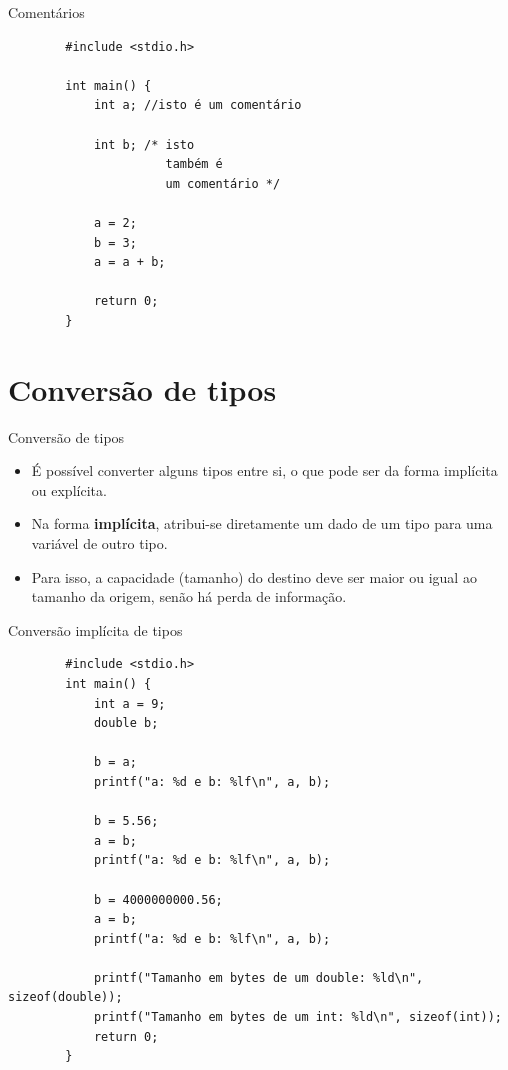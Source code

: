 \documentclass[handout]{beamer}
\begin{document}
\begin{frame}[fragile]{Comentários}
    \begin{verbatim}
        #include <stdio.h>

        int main() {
            int a; //isto é um comentário

            int b; /* isto
                      também é
                      um comentário */

            a = 2;
            b = 3;
            a = a + b;

            return 0;
        }
    \end{verbatim}
\end{frame}

\section{Conversão de tipos}

\begin{frame}[fragile]{Conversão de tipos}
    \begin{itemize}[<+->]
        \item É possível converter alguns tipos entre si, o que pode ser da forma implícita ou explícita.
        \item Na forma \textbf{implícita}, atribui-se diretamente um dado de um tipo para uma variável de outro tipo.
        \item Para isso, a capacidade (tamanho) do destino deve ser maior ou igual ao tamanho da origem, senão há perda de informação.
    \end{itemize}
\end{frame}

\begin{frame}[fragile]{Conversão implícita de tipos}
    \begin{verbatim}
        #include <stdio.h>
        int main() {
            int a = 9;
            double b;

            b = a;
            printf("a: %d e b: %lf\n", a, b);
            
            b = 5.56;
            a = b;
            printf("a: %d e b: %lf\n", a, b);
            
            b = 4000000000.56;
            a = b;
            printf("a: %d e b: %lf\n", a, b);
            
            printf("Tamanho em bytes de um double: %ld\n", sizeof(double));
            printf("Tamanho em bytes de um int: %ld\n", sizeof(int));
            return 0;
        }
      \end{verbatim}
\end{frame}
\end{document}
